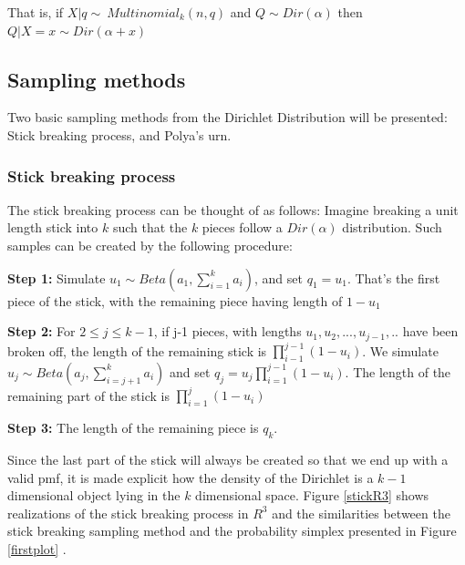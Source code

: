 \documentclass [twoside,hidelinks]{article}
\begin{document}
That is,  if $ X|q \sim\ Multinomial_k (n,q) $ and $ Q \sim Dir ( \alpha ) $ then $ Q| X=x \sim Dir ( \alpha + x) $

\subsection{Sampling methods}

Two basic sampling methods from the Dirichlet Distribution will be presented: Stick breaking process, and Polya's urn.

\subsubsection{Stick breaking process}

The stick breaking process can be thought of as follows: Imagine breaking a unit length stick into $k$ such that the $k$ pieces follow a $Dir ( \alpha)$  distribution. Such samples can be created by the following procedure:
\begin{compactitem}
	\item  \textbf{Step 1:} Simulate $ u_1 \sim Beta (a_1, \sum_{i=1}^k a_i ) $, and set $q_1 = u_1$. That's the first piece of the stick, with the remaining piece having length of $ 1-u_1$
	\item \textbf{Step 2:} For $ 2 \leq j \leq k-1$, if j-1 pieces, with lengths  $u_1,u_2,...,u_{j-1},..$ have been broken off, the length of the remaining stick is $\prod_{i-1}^{j-1}  (1 - u_i) $. We simulate $ u_j \sim Beta ( a_j, \sum_{i=j+1}^k a_i) $ and set  $q_j=u_j \prod_{i=1}^{j-1} (1-u_i)$. The length of the remaining part of the stick is  $\prod_{i=1}^{j} (1-u_i)$
	\item  \textbf{Step 3:} The length of the remaining piece is $q_k$.


\end{compactitem}
Since the last part of the stick will always be created so that we end up with a valid pmf, it is made explicit how the density of the Dirichlet is  a ${k-1}$ dimensional object lying in the $k$ dimensional space. Figure \ref{stickR3} shows realizations of the stick breaking process in $R^3$ and the similarities between the stick breaking sampling method and the probability simplex presented in Figure \ref{firstplot} .
\end{document}
